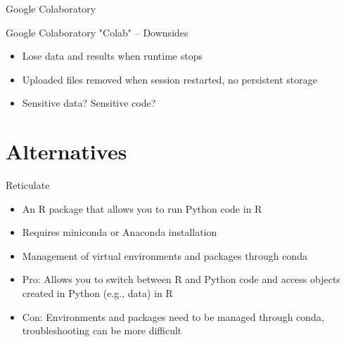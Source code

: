\documentclass[10pt, aspectratio=169]{beamer}
\newcommand{\cemph}[1]{\textcolor{mzescyan}{#1}}
\begin{document}
{\begin{frame}{Google Colaboratory}
    
\end{frame}

\begin{frame}{Google Colaboratory}
    \small
    \cemph{"Colab"} -- Downsides
    \begin{itemize}
        \item Lose data and results when runtime stops
        \item Uploaded files removed when session restarted, no persistent storage 
        \item Sensitive data? Sensitive code?
        \end{itemize}
    
    
\end{frame}

 	\section{Alternatives}
\begin{frame}{Reticulate}
    \begin{itemize}
        \item An R package that allows you to run Python code in R
        \item Requires miniconda or Anaconda installation
        \item Management of virtual environments and packages through conda
        \item Pro: Allows you to switch between R and Python code and access objects created in Python (e.g., data) in R
        \item Con: Environments and packages need to be managed through conda, troubleshooting can be more difficult
    \end{itemize}
\end{frame}

}
\end{document}
